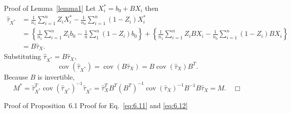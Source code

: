 \documentclass[aspectratio=169, 12pt]{beamer}
\begin{document}
\begin{frame}[label=pr-lemma-6-1]{Proof of Lemma~\ref{lemma1}}
  \small
  Let $X_i^*=b_0+BX_i$ then
  \begin{align*}
    \widehat{\tau}_{X^*}
    &= \frac{1}{n_1}\sum_{i=1}^{n}Z_iX_i^* - \frac{1}{n_0}\sum_{i=1}^{n}(1-Z_i)X_i^*\\
    &= \left\{\frac{1}{n_1}\sum_{i=1}^{n}Z_ib_0 - \frac{1}{n}\sum_{1}^{n}(1-Z_i)b_0\right\} + \left\{\frac{1}{n_1}\sum_{i=1}^{n}Z_iBX_i - \frac{1}{n_0}\sum_{i=1}^{n}(1-Z_i)BX_i\right\} \\
    &= B\widehat{\tau}_X.
  \end{align*}
  Substituting $\widehat{\tau}_{X^*}=B\widehat{\tau}_X$, 
  \[
  \operatorname{cov}(\widehat{\tau}_{X^*}) 
  = \operatorname{cov}(B\widehat{\tau}_X) 
  = B\operatorname{cov}(\widehat{\tau}_X)B^T.
  \]
  Because $B$ is invertible, 
  \[
  M^* =\widehat{\tau}_{X^*}^T\operatorname{cov}(\widehat{\tau}_{X^*})^{-1}\widehat{\tau}_{X^*}
  = \widehat{\tau}_X^TB^T(B^T)^{-1}\operatorname{cov}(\widehat{\tau}_X)^{-1}B^{-1}B\widehat{\tau}_X = M. \quad \Box
  \]
  \vfill
  \hfill\hyperlink{lemma-6-1<1>}{}
\end{frame}

\begin{frame}[label=pf-prop-6-1]{Proof of Proposition~6.1}
  Proof for Eq.~\eqref{eq:6.11} and \eqref{eq:6.12}
  \vfill
  \hfill\hyperlink{prop-6-1<1>}{}
\end{frame}
\end{document}
